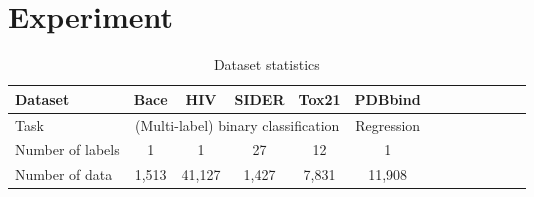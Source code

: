 \documentclass{article} \usepackage{iclr2020_conference,times}
\begin{document}
 \section{Experiment}
\begin{table}
\caption{Dataset statistics}\label{tab:statistics}
  \centering
  \begin{tabular}{lcccccccccccc}
    \toprule
    \small Dataset                & \small {Bace} & \small {HIV} & \small {SIDER} & \small {Tox21} & \small {PDBbind}\\
    \midrule
    \small Task                   & \multicolumn{4}{c}{(Multi-label) binary classification} & \small Regression \\
    \small Number of labels       & \small 1 & \small 1 & \small 27 & \small 12 & \small 1 \\
    \small Number of data         & \small 1,513 & \small 41,127 & \small 1,427 & \small 7,831 & \small 11,908 \\
\bottomrule
  \end{tabular}
\end{table}
\end{document}
